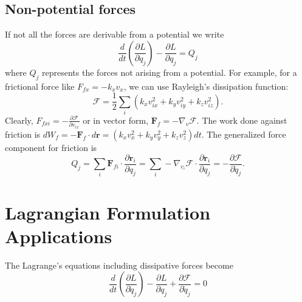 \documentclass[12pt,a4paper]{article}
\theoremstyle{definition}
\theoremstyle{remark}
\renewcommand{\vec}[1]{\mathbf{#1}}
\begin{document}
	\subsection{Non-potential forces}
	If not all the forces are derivable from a potential we write
	$$ \frac{d}{dt}\left(\frac{\partial L}{\partial \dot{q}_j}\right) - \frac{\partial L}{\partial q_j} = Q_j $$
	where $Q_j$ represents the forces not arising from a potential.
	For example, for a frictional force like $F_{fx} = -k_x v_x$, we can use Rayleigh's dissipation function:
	$$ \mathcal{F} = \frac{1}{2} \sum_i (k_x v_{ix}^2 + k_y v_{iy}^2 + k_z v_{iz}^2). $$
	Clearly, $F_{fxi} = -\frac{\partial \mathcal{F}}{\partial v_{ix}}$ or in vector form, $\vec{F}_f = -\nabla_v \mathcal{F}$.
	The work done against friction is $dW_f = -\vec{F}_f \cdot d\vec{r} = (k_x v_x^2 + k_y v_y^2 + k_z v_z^2) dt$.
	The generalized force component for friction is
	$$ Q_j = \sum_i \vec{F}_{fi} \cdot \frac{\partial \vec{r}_i}{\partial q_j} = \sum_i -\nabla_{v_i}\mathcal{F} \cdot \frac{\partial \vec{r}_i}{\partial q_j} = -\frac{\partial \mathcal{F}}{\partial \dot{q}_j}. $$
	
	\section{Lagrangian Formulation Applications }
	The Lagrange's equations including dissipative forces become
	\begin{equation} \label{eq:10}
		\frac{d}{dt}\left(\frac{\partial L}{\partial \dot{q}_j}\right) - \frac{\partial L}{\partial q_j} + \frac{\partial \mathcal{F}}{\partial \dot{q}_j} = 0
	\end{equation}
	
\end{document}
